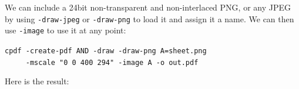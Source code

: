 \documentclass{book}
\begin{document}
We can include a 24bit non-transparent and non-interlaced PNG, or any JPEG by using \texttt{-draw-jpeg} or \texttt{-draw-png} to load it and assign it a name. We can then use \texttt{-image} to use it at any point:

\begin{framed}
 \noindent\small\verb?cpdf -create-pdf AND -draw -draw-png A=sheet.png?\\
 \noindent\small\verb?     -mscale "0 0 400 294" -image A -o out.pdf?
\end{framed}

\noindent Here is the result:

\bigskip
\ifdefined\HCode
{}
\else
{}
\fi
\bigskip
\end{document}
